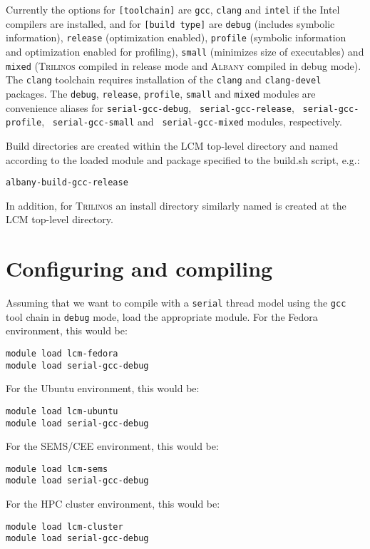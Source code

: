 \documentclass{article}
\newcommand{\trilinos}{\textsc{Trilinos}}
\newcommand{\albany}{\textsc{Albany}}
\newcommand{\lcm}{\textsc{LCM}}
\begin{document}
Currently the options for \verb+[toolchain]+ are \verb+gcc+,
\verb+clang+ and \verb+intel+ if the Intel compilers are installed,
and for \verb+[build type]+ are \verb+debug+ (includes symbolic
information), \verb+release+ (optimization enabled), \verb+profile+
(symbolic information and optimization enabled for profiling),
\verb+small+ (minimizes size of executables) and \verb+mixed+
(\trilinos{} compiled in release mode and \albany{} compiled in debug
mode). The \verb+clang+ toolchain requires installation of the
\verb+clang+ and \verb+clang-devel+ packages. The \verb+debug+,
\verb+release+, \verb+profile+, \verb+small+ and \verb+mixed+ modules
are convenience aliases for \verb+serial-gcc-debug+,
\verb+ serial-gcc-release+, \verb+ serial-gcc-profile+,
\verb+ serial-gcc-small+ and \verb+ serial-gcc-mixed+ modules,
respectively.

Build directories are created within the \lcm{} top-level directory
and named according to the loaded module and package specified to the
build.sh script, e.g.:
\begin{verbatim}
albany-build-gcc-release
\end{verbatim}
In addition, for \trilinos{} an install directory similarly named is
created at the \lcm{} top-level directory.

\section{Configuring and compiling}
\label{sec:config-build}

Assuming that we want to compile with a \verb+serial+ thread model
using the \verb+gcc+ tool chain in \verb+debug+ mode, load the
appropriate module.
For the Fedora environment, this would be:
\begin{verbatim}
module load lcm-fedora
module load serial-gcc-debug
\end{verbatim}
For the Ubuntu environment, this would be:
\begin{verbatim}
module load lcm-ubuntu
module load serial-gcc-debug
\end{verbatim}
For the SEMS/CEE environment, this would be:
\begin{verbatim}
module load lcm-sems
module load serial-gcc-debug
\end{verbatim}
For the HPC cluster environment, this would be:
\begin{verbatim}
module load lcm-cluster
module load serial-gcc-debug
\end{verbatim}
\end{document}
